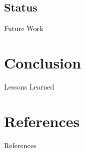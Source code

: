 \documentclass[10pt,aspectratio=169]{beamer}
\begin{document}
\subsection{Status}
	\begin{frame}{Future Work}
	\end{frame}

\section{Conclusion}%
	\begin{frame}{Lessons Learned}
	\end{frame}

\section{References}%

	\begin{frame}[t]{References}
			\footnotesize
			 
	\end{frame}
\end{document}
